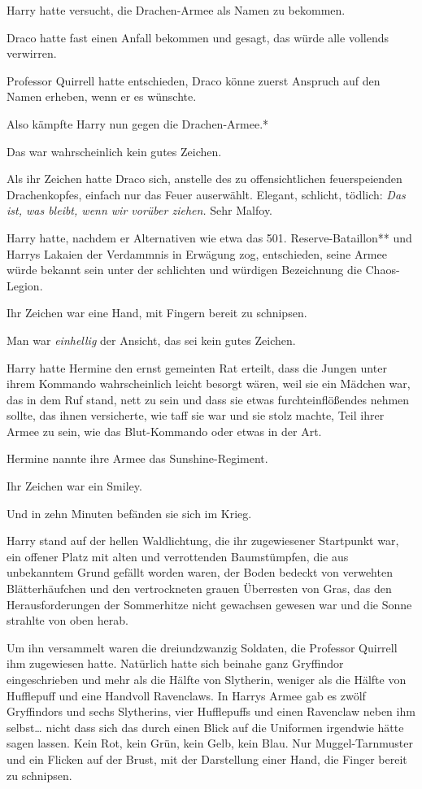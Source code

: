 {Harry hatte versucht, die Drachen-Armee als Namen zu bekommen.

Draco hatte fast einen Anfall bekommen und gesagt, das würde alle vollends verwirren.

Professor Quirrell hatte entschieden, Draco könne zuerst Anspruch auf den Namen erheben, wenn er es wünschte.

Also kämpfte Harry nun gegen die Drachen-Armee.*

Das war wahrscheinlich kein gutes Zeichen.

Als ihr Zeichen hatte Draco sich, anstelle des zu offensichtlichen feuerspeienden Drachenkopfes, einfach nur das Feuer auserwählt. Elegant, schlicht, tödlich: \emph{Das ist, was bleibt, wenn wir vorüber ziehen.} Sehr Malfoy.

Harry hatte, nachdem er Alternativen wie etwa das 501. Reserve-Bataillon** und Harrys Lakaien der Verdammnis in Erwägung zog, entschieden, seine Armee würde bekannt sein unter der schlichten und würdigen Bezeichnung die Chaos-Legion.

Ihr Zeichen war eine Hand, mit Fingern bereit zu schnipsen.

Man war \emph{einhellig} der Ansicht, das sei kein gutes Zeichen.

Harry hatte Hermine den ernst gemeinten Rat erteilt, dass die Jungen unter ihrem Kommando wahrscheinlich leicht besorgt wären, weil sie ein Mädchen war, das in dem Ruf stand, nett zu sein und dass sie etwas furchteinflößendes nehmen sollte, das ihnen versicherte, wie taff sie war und sie stolz machte, Teil ihrer Armee zu sein, wie das Blut-Kommando oder etwas in der Art.

Hermine nannte ihre Armee das Sunshine-Regiment.

Ihr Zeichen war ein Smiley.

Und in zehn Minuten befänden sie sich im Krieg.

Harry stand auf der hellen Waldlichtung, die ihr zugewiesener Startpunkt war, ein offener Platz mit alten und verrottenden Baumstümpfen, die aus unbekanntem Grund gefällt worden waren, der Boden bedeckt von verwehten Blätterhäufchen und den vertrockneten grauen Überresten von Gras, das den Herausforderungen der Sommerhitze nicht gewachsen gewesen war und die Sonne strahlte von oben herab.

Um ihn versammelt waren die dreiundzwanzig Soldaten, die Professor Quirrell ihm zugewiesen hatte. Natürlich hatte sich beinahe ganz Gryffindor eingeschrieben und mehr als die Hälfte von Slytherin, weniger als die Hälfte von Hufflepuff und eine Handvoll Ravenclaws. In Harrys Armee gab es zwölf Gryffindors und sechs Slytherins, vier Hufflepuffs und einen Ravenclaw neben ihm selbst… nicht dass sich das durch einen Blick auf die Uniformen irgendwie hätte sagen lassen. Kein Rot, kein Grün, kein Gelb, kein Blau. Nur Muggel-Tarnmuster und ein Flicken auf der Brust, mit der Darstellung einer Hand, die Finger bereit zu schnipsen.

}
